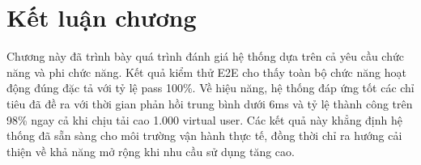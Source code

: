 \section{Kết luận chương}
Chương này đã trình bày quá trình đánh giá hệ thống dựa trên cả yêu cầu chức năng và phi chức năng. Kết quả kiểm thử E2E cho thấy toàn bộ chức năng hoạt động đúng đặc tả với tỷ lệ pass 100\%. Về hiệu năng, hệ thống đáp ứng tốt các chỉ tiêu đã đề ra với thời gian phản hồi trung bình dưới 6ms và tỷ lệ thành công trên 98\% ngay cả khi chịu tải cao 1.000 virtual user. Các kết quả này khẳng định hệ thống đã sẵn sàng cho môi trường vận hành thực tế, đồng thời chỉ ra hướng cải thiện về khả năng mở rộng khi nhu cầu sử dụng tăng cao.
